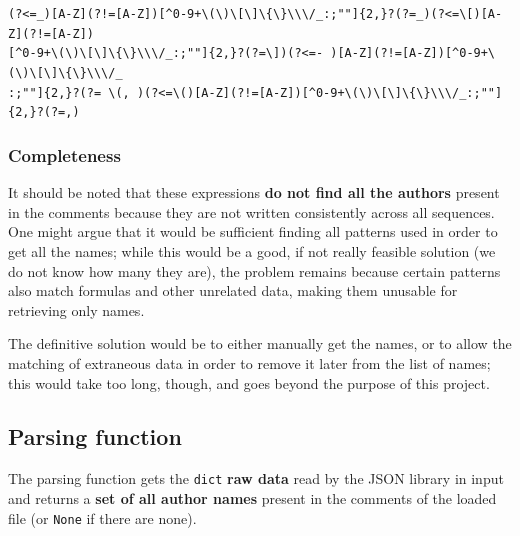 \documentclass[11pt]{article}
\begin{document}
\texttt{(?\textless{}=\_){[}A-Z{]}(?!={[}A-Z{]}){[}\^{}0-9+\textbackslash{}(\textbackslash{})\textbackslash{}{[}\textbackslash{}{]}\textbackslash{}\{\textbackslash{}\}\textbackslash{}\textbackslash{}\textbackslash{}/\_:;""{]}\{2,\}?(?=\_)\textbar{}(?\textless{}=\textbackslash{}{[}){[}A-Z{]}(?!={[}A-Z{]}) \\ {[}\^{}0-9+\textbackslash{}(\textbackslash{})\textbackslash{}{[}\textbackslash{}{]}\textbackslash{}\{\textbackslash{}\}\textbackslash{}\textbackslash{}\textbackslash{}/\_:;""{]}\{2,\}?(?=\textbackslash{}{]})\textbar{}(?\textless{}=-\ ){[}A-Z{]}(?!={[}A-Z{]}){[}\^{}0-9+\textbackslash{}(\textbackslash{})\textbackslash{}{[}\textbackslash{}{]}\textbackslash{}\{\textbackslash{}\}\textbackslash{}\textbackslash{}\textbackslash{}/\_ \\ :;""{]}\{2,\}?(?=\ \textbackslash{}(\textbar{},\ )\textbar{}(?\textless{}=\textbackslash{}(){[}A-Z{]}(?!={[}A-Z{]}){[}\^{}0-9+\textbackslash{}(\textbackslash{})\textbackslash{}{[}\textbackslash{}{]}\textbackslash{}\{\textbackslash{}\}\textbackslash{}\textbackslash{}\textbackslash{}/\_:;""{]}\{2,\}?(?=,)}


\subsubsection*{Completeness}\label{about-this-methods-completeness}

It should be noted that these expressions \textbf{do not find all the
authors} present in the comments because they are not written
consistently across all sequences. One might argue that it would be
sufficient finding all patterns used in order to get all the names;
while this would be a good, if not really feasible solution (we do not
know how many they are), the problem remains because certain patterns
also match formulas and other unrelated data, making them unusable for
retrieving only names.

The definitive solution would be to either manually get the names, or to
allow the matching of extraneous data in order to remove it later from
the list of names; this would take too long, though, and goes beyond the
purpose of this project.


\subsection{Parsing function}\label{the-parsing-function}

The parsing function gets the \texttt{dict} \textbf{raw data} read by
the JSON library in input and returns a \textbf{set of all author names}
present in the comments of the loaded file (or \texttt{None} if there
are none).
\end{document}
